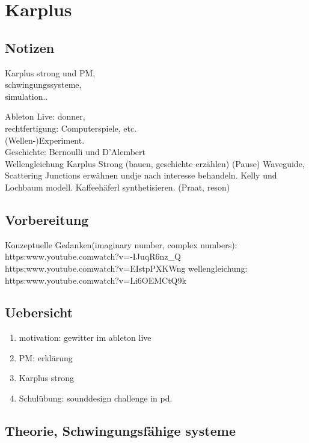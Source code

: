 \chapter{Karplus}
\label{Karplus}
\section{Notizen}



Karplus strong und PM,\\
schwingungssysteme,\\
simulation..

Ableton Live: donner,\\
rechtfertigung: Computerspiele, etc.\\
(Wellen-)Experiment.\\
Geschichte: Bernoulli und D'Alembert\\
Wellengleichung
Karplus Strong (bauen, geschichte erzählen)
(Pause)
Waveguide, Scattering Junctions erwähnen undje nach interesse behandeln. Kelly und Lochbaum modell.
Kaffeehäferl synthetisieren. (Praat, reson)



\section{Vorbereitung}


Konzeptuelle Gedanken(imaginary number, complex numbers): \\
https:\/\/www.youtube.com\/watch?v=-IJuqR6nz\_Q \\
https:\/\/www.youtube.com\/watch?v=EIstpPXKWng
wellengleichung:\\
https:\/\/www.youtube.com\/watch?v=Li6OEMCtQ9k




\section{Uebersicht}


\begin{enumerate}
	\item motivation: gewitter im ableton live
	\item PM: erklärung
	\item Karplus strong 
	\item Schulübung: sounddesign challenge in pd.

\end{enumerate}

\section{Theorie, Schwingungsfähige systeme}


